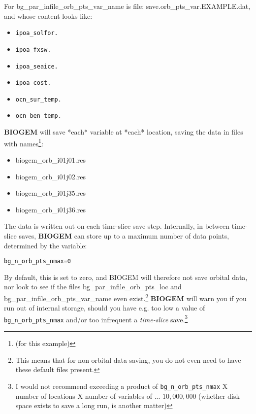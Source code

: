 For \footnotesize\textsf{bg\_par\_infile\_orb\_pts\_var\_name }\normalsize  is file:  \footnotesize\textsf{save.orb\_pts\_var.EXAMPLE.dat}\normalsize, and whose content looks like:
\vspace{1mm}
\begin{itemize}[noitemsep]
\item[] \texttt{ipoa\_solfor.}
\item[] \texttt{ipoa\_fxsw.}
\item[] \texttt{ipoa\_seaice.}
\item[] \texttt{ipoa\_cost.}
\item[] \texttt{ocn\_sur\_temp.}
\item[] \texttt{ocn\_ben\_temp.}
\end{itemize}
\vspace{1mm}

\textbf{BIOGEM} will save *each* variable at *each* location, saving the data in files with names\footnote{(for this example)}:
\vspace{1mm}
\begin{itemize}[noitemsep]
\item[] \textsf{\footnotesize biogem\_orb\_i01j01.res}
\item[] \textsf{\footnotesize biogem\_orb\_i01j02.res}
\item[] \textsf{\footnotesize biogem\_orb\_i01j35.res}
\item[] \textsf{\footnotesize biogem\_orb\_i01j36.res}
\end{itemize}
\vspace{1mm}

The data is written out on each time-slice save step.
Internally, in between time-slice saves, \textbf{BIOGEM} can store up to a maximum number of data points, determined by the variable:
\begin{verbatim}
bg_n_orb_pts_nmax=0
\end{verbatim}
By default, this is set to zero, and BIOGEM will therefore not save orbital data, nor look to see if the files \textsf{\footnotesize bg\_par\_infile\_orb\_pts\_loc } and \textsf{\footnotesize bg\_par\_infile\_orb\_pts\_var\_name} even exist.\footnote{This means that for non orbital data saving, you do not even need to have these default files present.} \textbf{BIOGEM} will warn you if you run out of internal storage, should you have e.g. too low a value of \texttt{bg\_n\_orb\_pts\_nmax} and/or too infrequent a\textit{ time-slice} save.\footnote{I would not recommend exceeding a product of \texttt{bg\_n\_orb\_pts\_nmax} X number of locations X number of variables of ... \(10,000,000\) (whether disk space exists to save a long run, is another matter)}

